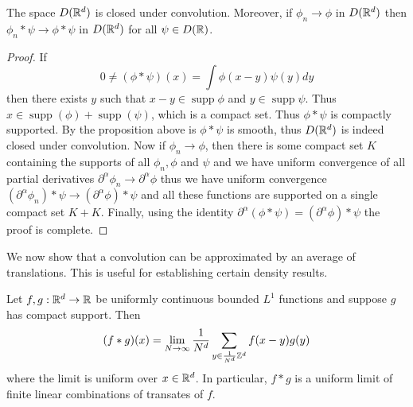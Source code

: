 \documentclass[twoside, a4paper, 10pt]{amsart}
\begin{document}
\begin{corol} The space $D(\mathbb{R}^d)$ is closed under convolution. Moreover, if $\phi_n \to \phi$ in $D(\mathbb{R}^d)$ then $\phi_n * \psi \to \phi * \psi$ in $D(\mathbb{R}^d)$ for all $\psi \in D(\mathbb{R})$.

\end{corol}

\begin{proof} If $$0 \neq (\phi * \psi) (x) = \int \phi(x-y) \psi(y) dy$$ then there exists $y$ such that $x-y \in \operatorname{supp} \phi $ and $y \in \operatorname{supp} \psi$. Thus $x \in \operatorname{supp}(\phi) + \operatorname{supp}(\psi)$, which is a compact set. Thus $\phi * \psi$ is compactly supported. By the proposition above is $\phi * \psi$ is smooth, thus $D(\mathbb{R}^d)$ is indeed closed under convolution.  Now if $\phi_n \to \phi$, then there is some compact set $K$ containing the supports of all $\phi_n, \phi$ and $\psi$ and we have uniform convergence of all partial derivatives $\partial^{\alpha} \phi_n \to \partial^{\alpha} \phi$ thus we have uniform convergence $(\partial^{\alpha} \phi_n) * \psi \to (\partial^{\alpha} \phi) * \psi$ and all these functions are supported on a single compact set $K + K$. Finally, using the identity $\partial^{\alpha} (\phi * \psi) = (\partial^{\alpha} \phi) * \psi$ the proof is complete.  \end{proof}

We now show that a convolution can be approximated by an average of translations. This is useful for establishing certain density results.

\begin{prop}\label{prop: convolution is approximate average} Let $f,g:\mathbb{R}^d \to \mathbb{R}$ be uniformly continuous bounded $L^1$ functions and suppose $g$ has compact support. Then $$(f * g)(x) = \lim_{N \to \infty} \frac{1}{N^d} \sum_{y \in \frac{1}{N^d}\mathbb{Z}^d} f(x-y) g(y)$$ where the limit is uniform over $x \in \mathbb{R}^d$. In particular, $f*g$ is a uniform limit of finite linear combinations of transates of $f$.

\end{prop}
\end{document}
